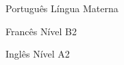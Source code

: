 

\begin{cvskills}

  \cvskill
    {Português}
    {Língua Materna}

  \cvskill
    {Francês}
    {Nível B2}

  \cvskill
    {Inglês}
    {Nível A2}

\end{cvskills}